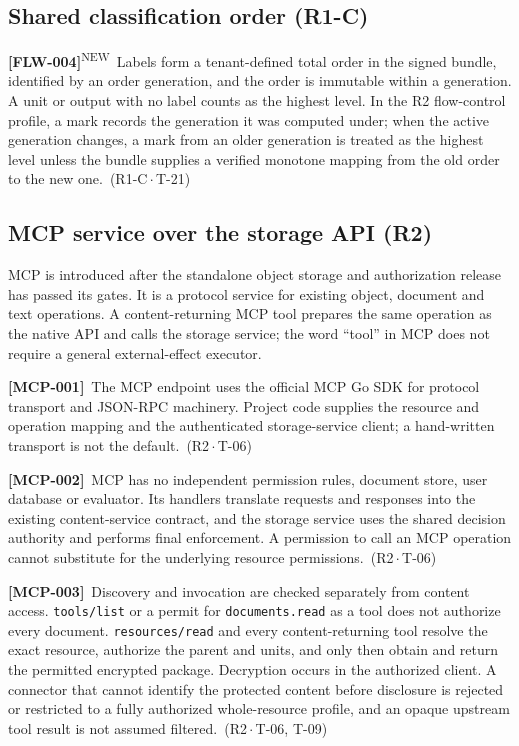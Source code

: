 \documentclass[11pt,a4paper]{article}
\newcommand{\code}[1]{{\small\nolinkurl{#1}}}
\newcommand{\reqtag}[2]{{\footnotesize\color{accent}(#1\,$\cdot$\,#2)}}
\newcommand{\req}[4]{\par\noindent\hypertarget{req:#1}{\textbf{[#1]}}\ #4\ \reqtag{#2}{#3}\par}
\newcommand{\reqn}[4]{\par\noindent\hypertarget{req:#1}{\textbf{[#1]}}\textsuperscript{\color{accent}\tiny NEW}\ #4\ \reqtag{#2}{#3}\par}
\begin{document}
\subsection{Shared classification order (R1-C)}
\reqn{FLW-004}{R1-C}{T-21}{Labels form a tenant-defined total order in the signed bundle, identified by an order generation, and the order is immutable within a generation. A unit or output with no label counts as the highest level. In the R2 flow-control profile, a mark records the generation it was computed under; when the active generation changes, a mark from an older generation is treated as the highest level unless the bundle supplies a verified monotone mapping from the old order to the new one.}

\subsection{MCP service over the storage API (R2)}
MCP is introduced after the standalone object storage and authorization release has passed its gates. It is a protocol service for existing object, document and text operations. A content-returning MCP tool prepares the same operation as the native API and calls the storage service; the word ``tool'' in MCP does not require a general external-effect executor.
\req{MCP-001}{R2}{T-06}{The MCP endpoint uses the official MCP Go SDK for protocol transport and JSON-RPC machinery. Project code supplies the resource and operation mapping and the authenticated storage-service client; a hand-written transport is not the default.}
\req{MCP-002}{R2}{T-06}{MCP has no independent permission rules, document store, user database or evaluator. Its handlers translate requests and responses into the existing content-service contract, and the storage service uses the shared decision authority and performs final enforcement. A permission to call an MCP operation cannot substitute for the underlying resource permissions.}
\req{MCP-003}{R2}{T-06, T-09}{Discovery and invocation are checked separately from content access. \code{tools/list} or a permit for \code{documents.read} as a tool does not authorize every document. \code{resources/read} and every content-returning tool resolve the exact resource, authorize the parent and units, and only then obtain and return the permitted encrypted package. Decryption occurs in the authorized client. A connector that cannot identify the protected content before disclosure is rejected or restricted to a fully authorized whole-resource profile, and an opaque upstream tool result is not assumed filtered.}
\end{document}
